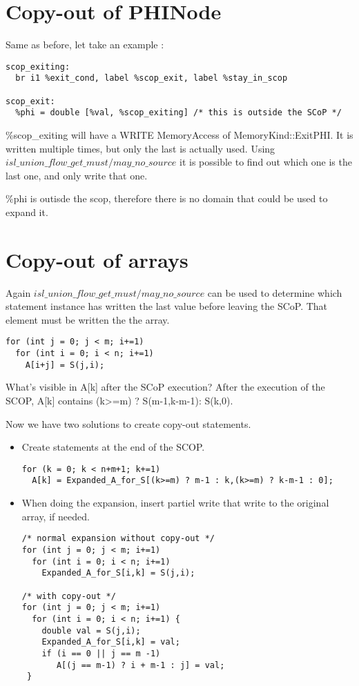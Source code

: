 \section{Copy-out of PHINode}
Same as before, let take an example :
\begin{lstlisting}[frame=single]
scop_exiting:
  br i1 %exit_cond, label %scop_exit, label %stay_in_scop

scop_exit:
  %phi = double [%val, %scop_exiting] /* this is outside the SCoP */
\end{lstlisting}

\%scop\_exiting will have a WRITE MemoryAccess of MemoryKind::ExitPHI. It is written multiple times, but only the last is actually used. Using $isl\_union\_flow\_get\_{must/may}\_no\_source$ it is possible to find out which one is the last one, and only write that one.

\%phi is outisde the scop, therefore there is no domain that could be used to expand it.


\section{Copy-out of arrays}

Again $isl\_union\_flow\_get\_{must/may}\_no\_source$ can be used to determine which statement instance has written the last value before leaving the SCoP. That element must be written the the array.

\begin{lstlisting}[frame=single]
for (int j = 0; j < m; i+=1)
  for (int i = 0; i < n; i+=1)
    A[i+j] = S(j,i);
\end{lstlisting}

What's visible in A[k] after the SCoP execution? After the execution of the SCOP, A[k] contains (k>=m) ? S(m-1,k-m-1): S(k,0).

Now we have two solutions to create copy-out statements.
\begin{itemize}
\item Create statements at the end of the SCOP.
\begin{lstlisting}[frame=single]
for (k = 0; k < n+m+1; k+=1)
  A[k] = Expanded_A_for_S[(k>=m) ? m-1 : k,(k>=m) ? k-m-1 : 0];
\end{lstlisting}

\item When doing the expansion, insert partiel write that write to the original array, if needed.
\begin{lstlisting}[frame=single]
/* normal expansion without copy-out */
for (int j = 0; j < m; i+=1)
  for (int i = 0; i < n; i+=1)
    Expanded_A_for_S[i,k] = S(j,i);

/* with copy-out */
for (int j = 0; j < m; i+=1)
  for (int i = 0; i < n; i+=1) {
    double val = S(j,i); 
    Expanded_A_for_S[i,k] = val;
    if (i == 0 || j == m -1) 
       A[(j == m-1) ? i + m-1 : j] = val; 
 }
\end{lstlisting}
\end{itemize}



